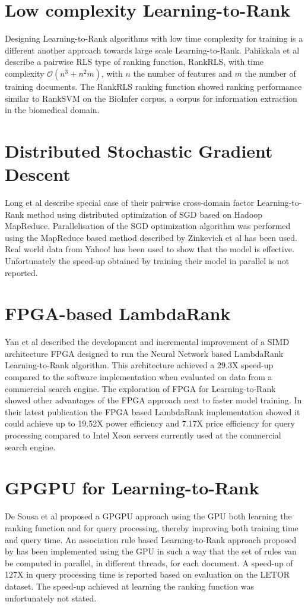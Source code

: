 \section{Low complexity Learning-to-Rank}
Designing Learning-to-Rank algorithms with low time complexity for training is a different another approach towards large scale Learning-to-Rank. Pahikkala et al\cite{Pahikkala2009} describe a pairwise \ac{RLS} type of ranking function, RankRLS, with time complexity $\mathcal{O}(n^3+n^2m)$, with $n$ the number of features and $m$ the number of training documents. The RankRLS ranking function showed ranking performance similar to RankSVM on the BioInfer corpus\cite{Pyysalo2007}, a corpus for information extraction in the biomedical domain.
\section{Distributed Stochastic Gradient Descent}
Long et al\cite{Long2012} describe special case of their pairwise cross-domain factor Learning-to-Rank method using distributed optimization of \ac{SGD} based on Hadoop MapReduce. Parallelisation of the \ac{SGD} optimization algorithm was performed using the MapReduce based method described by  Zinkevich et al\cite{Zinkevich2010} has been used. Real world data from Yahoo! has been used to show that the model is effective. Unfortunately the speed-up obtained by training their model in parallel is not reported.
\section{FPGA-based LambdaRank}
Yan et al\cite{Yan2009,Yan2010,Yan2011,Yan2012} described the development and incremental improvement of a \ac{SIMD} architecture \ac{FPGA} designed to run the Neural Network based LambdaRank Learning-to-Rank algorithm. This architecture achieved a 29.3X speed-up compared to the software implementation when evaluated on data from a commercial search engine. The exploration of \ac{FPGA} for Learning-to-Rank showed other advantages of the \ac{FPGA} approach next to faster model training. In their latest publication\cite{Yan2012} the \ac{FPGA} based LambdaRank implementation showed it could achieve up to 19.52X power efficiency and 7.17X price efficiency for query processing compared to Intel Xeon servers currently used at the commercial search engine.
\section{GPGPU for Learning-to-Rank}
De Sousa et al\cite{DeSousa2012} proposed a \ac{GPGPU} approach using the \ac{GPU} both learning the ranking function and for query processing, thereby improving both training time and query time. An association rule based Learning-to-Rank approach proposed by \cite{Veloso2008} has been implemented using the \ac{GPU} in such a way that the set of rules van be computed in parallel, in different threads, for each document. A speed-up of 127X in query processing time is reported based on evaluation on the LETOR dataset. The speed-up achieved at learning the ranking function was unfortunately not stated.